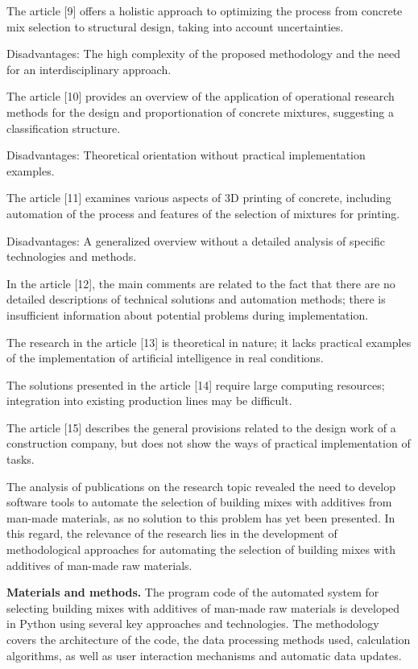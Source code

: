 \begin{multicols}{2}
The article {[}9{]} offers a holistic approach to optimizing the process
from concrete mix selection to structural design, taking into account
uncertainties.

Disadvantages: The high complexity of the proposed methodology and the
need for an interdisciplinary approach.

The article {[}10{]} provides an overview of the application of
operational research methods for the design and proportionation of
concrete mixtures, suggesting a classification structure.

Disadvantages: Theoretical orientation without practical implementation
examples.

The article {[}11{]} examines various aspects of 3D printing of
concrete, including automation of the process and features of the
selection of mixtures for printing.

Disadvantages: A generalized overview without a detailed analysis of
specific technologies and methods.

In the article {[}12{]}, the main comments are related to the fact that
there are no detailed descriptions of technical solutions and automation
methods; there is insufficient information about potential problems
during implementation.

The research in the article {[}13{]} is theoretical in nature; it lacks
practical examples of the implementation of artificial intelligence in
real conditions.

The solutions presented in the article {[}14{]} require large computing
resources; integration into existing production lines may be difficult.

The article {[}15{]} describes the general provisions related to the
design work of a construction company, but does not show the ways of
practical implementation of tasks.

The analysis of publications on the research topic revealed the need to
develop software tools to automate the selection of building mixes with
additives from man-made materials, as no solution to this problem has
yet been presented. In this regard, the relevance of the research lies
in the development of methodological approaches for automating the
selection of building mixes with additives of man-made raw materials.

{\bfseries Materials and methods.} The program code of the automated system
for selecting building mixes with additives of man-made raw materials is
developed in Python using several key approaches and technologies. The
methodology covers the architecture of the code, the data processing
methods used, calculation algorithms, as well as user interaction
mechanisms and automatic data updates.


\end{multicols}

